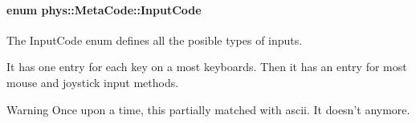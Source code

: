 \hypertarget{classphys_1_1MetaCode_a3e501cbb5bf0f6f1fdb7211465bda8d8}{
\paragraph[{InputCode}]{\setlength{\rightskip}{0pt plus 5cm}enum {\bf phys::MetaCode::InputCode}}\hfill}
\label{da/dc9/classphys_1_1MetaCode_a3e501cbb5bf0f6f1fdb7211465bda8d8}


The InputCode enum defines all the posible types of inputs. 

It has one entry for each key on a most keyboards. Then it has an entry for most mouse and joystick input methods. \begin{DoxyWarning}{Warning}
Once upon a time, this partially matched with ascii. It doesn't anymore. 
\end{DoxyWarning}
